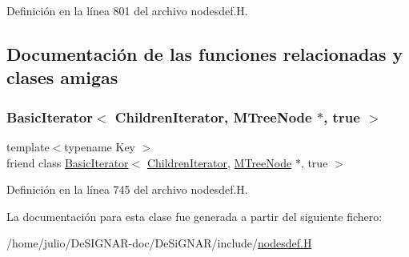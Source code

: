Definición en la línea 801 del archivo nodesdef.\+H.



\subsection{Documentación de las funciones relacionadas y clases amigas}
\mbox{\label{class_designar_1_1_m_tree_node_1_1_children_iterator_a9318ecb15aa59102557883ca0b98fea5}} 
\subsubsection{\texorpdfstring{Basic\+Iterator$<$ Children\+Iterator, M\+Tree\+Node $\ast$, true $>$}{BasicIterator< ChildrenIterator, MTreeNode *, true >}}
{\footnotesize\ttfamily template$<$typename Key $>$ \\
friend class \hyperlink{class_designar_1_1_basic_iterator}{Basic\+Iterator}$<$ \hyperlink{class_designar_1_1_m_tree_node_1_1_children_iterator}{Children\+Iterator}, \hyperlink{class_designar_1_1_m_tree_node}{M\+Tree\+Node} $\ast$, true $>$\hspace{0.3cm}{\ttfamily [friend]}}



Definición en la línea 745 del archivo nodesdef.\+H.



La documentación para esta clase fue generada a partir del siguiente fichero\+:\begin{DoxyCompactItemize}
\item 
/home/julio/\+De\+S\+I\+G\+N\+A\+R-\/doc/\+De\+Si\+G\+N\+A\+R/include/\hyperlink{nodesdef_8_h}{nodesdef.\+H}\end{DoxyCompactItemize}
